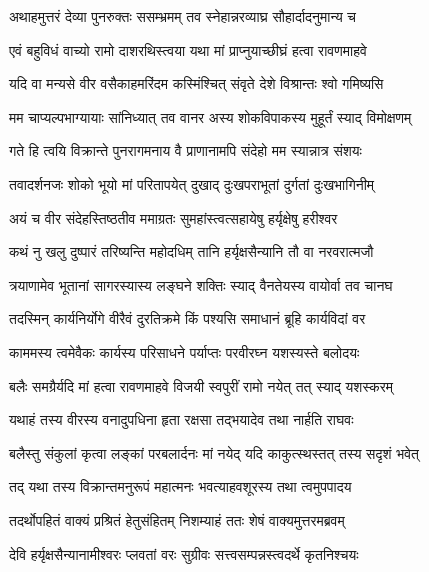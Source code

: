 
\twolineshloka
{अथाहमुत्तरं देव्या पुनरुक्तः ससम्भ्रमम्}
{तव स्नेहान्नरव्याघ्र सौहार्दादनुमान्य च} %

\twolineshloka
{एवं बहुविधं वाच्यो रामो दाशरथिस्त्वया}
{यथा मां प्राप्नुयाच्छीघ्रं हत्वा रावणमाहवे} %

\twolineshloka
{यदि वा मन्यसे वीर वसैकाहमरिंदम}
{कस्मिंश्चित् संवृते देशे विश्रान्तः श्वो गमिष्यसि} %

\twolineshloka
{मम चाप्यल्पभाग्यायाः सांनिध्यात् तव वानर}
{अस्य शोकविपाकस्य मुहूर्तं स्याद् विमोक्षणम्} %

\twolineshloka
{गते हि त्वयि विक्रान्ते पुनरागमनाय वै}
{प्राणानामपि संदेहो मम स्यान्नात्र संशयः} %

\twolineshloka
{तवादर्शनजः शोको भूयो मां परितापयेत्}
{दुखाद् दुःखपराभूतां दुर्गतां दुःखभागिनीम्} %

\twolineshloka
{अयं च वीर संदेहस्तिष्ठतीव ममाग्रतः}
{सुमहांस्त्वत्सहायेषु हर्यृक्षेषु हरीश्वर} %

\twolineshloka
{कथं नु खलु दुष्पारं तरिष्यन्ति महोदधिम्}
{तानि हर्यृक्षसैन्यानि तौ वा नरवरात्मजौ} %

\twolineshloka
{त्रयाणामेव भूतानां सागरस्यास्य लङ्घने}
{शक्तिः स्याद् वैनतेयस्य वायोर्वा तव चानघ} %

\twolineshloka
{तदस्मिन् कार्यनिर्योगे वीरैवं दुरतिक्रमे}
{किं पश्यसि समाधानं ब्रूहि कार्यविदां वर} %

\twolineshloka
{काममस्य त्वमेवैकः कार्यस्य परिसाधने}
{पर्याप्तः परवीरघ्न यशस्यस्ते बलोदयः} %

\twolineshloka
{बलैः समग्रैर्यदि मां हत्वा रावणमाहवे}
{विजयी स्वपुरीं रामो नयेत् तत् स्याद् यशस्करम्} %

\twolineshloka
{यथाहं तस्य वीरस्य वनादुपधिना हृता}
{रक्षसा तद्भयादेव तथा नार्हति राघवः} %

\twolineshloka
{बलैस्तु संकुलां कृत्वा लङ्कां परबलार्दनः}
{मां नयेद् यदि काकुत्स्थस्तत् तस्य सदृशं भवेत्} %

\twolineshloka
{तद् यथा तस्य विक्रान्तमनुरूपं महात्मनः}
{भवत्याहवशूरस्य तथा त्वमुपपादय} %

\twolineshloka
{तदर्थोपहितं वाक्यं प्रश्रितं हेतुसंहितम्}
{निशम्याहं ततः शेषं वाक्यमुत्तरमब्रवम्} %

\twolineshloka
{देवि हर्यृक्षसैन्यानामीश्वरः प्लवतां वरः}
{सुग्रीवः सत्त्वसम्पन्नस्त्वदर्थे कृतनिश्चयः} %

